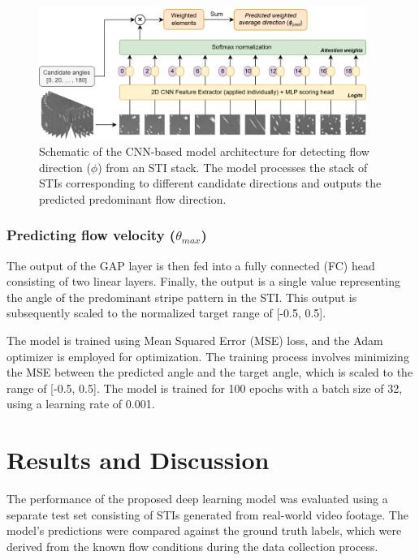 \documentclass[12pt]{elsarticle}
\begin{document}
\begin{figure}[!htbp]
    \centering
    \includegraphics[width=0.95\textwidth]{plots/CNN_model_direction.drawio.png}
    \caption{Schematic of the CNN-based model architecture for detecting flow direction ($\phi$) from an STI stack. The model processes the stack of STIs corresponding to different candidate directions and outputs the predicted predominant flow direction.}
    \label{fig:CNN_model_direction}
\end{figure}

\subsubsection{Predicting flow velocity ($\theta_{max}$)}
The output of the GAP layer is then fed into a fully connected (FC) head consisting of two linear layers. Finally, the output is a single value representing the angle of the predominant stripe pattern in the STI. This output is subsequently scaled to the normalized target range of [-0.5, 0.5].

The model is trained using Mean Squared Error (MSE) loss, and the Adam optimizer is employed for optimization. The training process involves minimizing the MSE between the predicted angle and the target angle, which is scaled to the range of [-0.5, 0.5]. The model is trained for 100 epochs with a batch size of 32, using a learning rate of 0.001.

\section{Results and Discussion}
\label{sec:Results}
The performance of the proposed deep learning model was evaluated using a separate test set consisting of STIs generated from real-world video footage. The model's predictions were compared against the ground truth labels, which were derived from the known flow conditions during the data collection process.


\newpage

\end{document}
